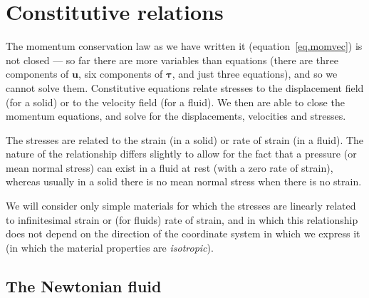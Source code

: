 \documentclass[twoside,11pt]		{report}
\begin{document}
\chapter{Constitutive relations}
\label{ch.constit}

The momentum conservation law as we have written it
(equation~\ref{eq.momvec}) is not closed --- so far there are more
variables than equations (there are three components of $\bm{u}$, six
components of $\bm{\tau}$, and just three equations), and so we cannot
solve them.  Constitutive equations relate stresses to the
displacement field (for a solid) or to the velocity field (for a
fluid). We then are able to close the momentum equations, and solve
for the displacements, velocities and stresses.

The stresses are related to the strain (in a solid) or rate of strain
(in a fluid). The nature of the relationship differs slightly to allow
for the fact that a pressure (or mean normal stress) can exist in a
fluid at rest (\ie with a zero rate of strain), whereas usually in a
solid there is no mean normal stress when there is no strain.

We will consider only simple materials for which the stresses are
linearly related to infinitesimal strain or (for fluids) rate of
strain, and in which this relationship does not depend on the
direction of the coordinate system in which we express it (\ie in
which the material properties are \emph{isotropic}).

\section{The Newtonian fluid}
\end{document}
